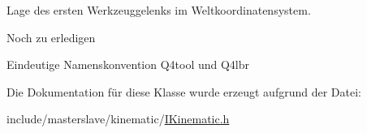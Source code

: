 Lage des ersten Werkzeuggelenks im Weltkoordinatensystem. 

\begin{DoxyRefDesc}{Noch zu erledigen}
\item[\hyperlink{todo__todo000011}{Noch zu erledigen}]Eindeutige Namenskonvention Q4tool und Q4lbr \end{DoxyRefDesc}


Die Dokumentation für diese Klasse wurde erzeugt aufgrund der Datei\-:\begin{DoxyCompactItemize}
\item 
include/masterslave/kinematic/\hyperlink{IKinematic_8h}{I\-Kinematic.\-h}\end{DoxyCompactItemize}
